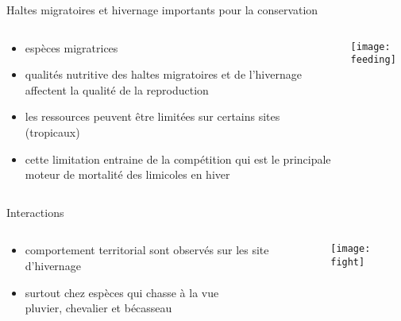 \documentclass[10pt]{beamer}
\begin{document}
\begin{frame}{Haltes migratoires et hivernage importants pour la conservation}
  \begin{columns}
    \begin{column}[c]{0.60\textwidth}
      \begin{itemize}[<+->]
      \item espèces migratrices 
      \item qualités nutritive des haltes migratoires {\tiny
          \cite{Morrison2007,Studds2017}} et de l'hivernage {\tiny
          \cite{Piersma1993,Tulp2009}}  affectent la qualité de la
        reproduction
      \item les ressources peuvent être limitées sur certains sites
        (tropicaux) 
      \item cette limitation entraine de la compétition qui est le
        principale moteur de mortalité des limicoles en hiver {\tiny \cite{Baker1973}}
      \end{itemize}
    \end{column}
    \begin{column}[c]{0.4\textwidth}
      \begin{center}
         \texttt{[image: feeding]}     
      \end{center}
    \end{column}
  \end{columns}
\end{frame}




\begin{frame}{Interactions}
  \begin{columns}
    \begin{column}[c]{0.6\textwidth}
      \begin{itemize}
      \item comportement territorial sont observés sur les site
        d'hivernage
      \item surtout chez espèces qui chasse à la vue \\ {\footnotesize
          pluvier, chevalier et bécasseau} {\tiny \cite{Colwell2000}}
      \end{itemize}
    \end{column}
    \begin{column}[c]{0.4\textwidth}
       \texttt{[image: fight]}     
    \end{column}
  \end{columns}
\end{frame}
\end{document}
